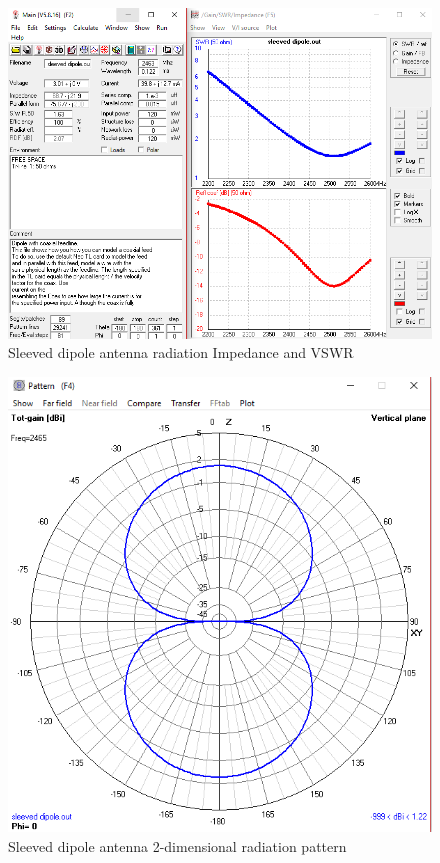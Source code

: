\begin{figure}[h!]
\centering
\includegraphics[scale=0.6]{figures/SleevedDipoleImpedanceVSWR.PNG}
\caption{Sleeved dipole  antenna radiation Impedance and VSWR}
\end{figure}

\begin{figure}[h!]
\centering
\includegraphics[scale=0.60]{figures/SleevedDipoleRadiationPatternPNG.PNG}
\caption{Sleeved dipole  antenna 2-dimensional radiation pattern}
\end{figure}

